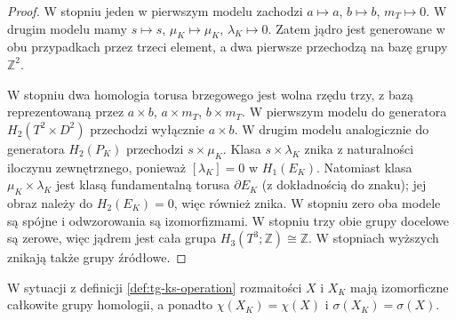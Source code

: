 \begin{proof}
W stopniu jeden w pierwszym modelu zachodzi
$a\mapsto a$, $b\mapsto b$, $m_T\mapsto0$.
W drugim modelu mamy $s\mapsto s$,
$\mu_K\mapsto\mu_K$, $\lambda_K\mapsto0$.
Zatem jądro jest generowane w obu przypadkach
przez trzeci element, a dwa pierwsze przechodzą
na bazę grupy $\mathbb Z^2$.

W stopniu dwa homologia torusa brzegowego jest
wolna rzędu trzy, z bazą reprezentowaną przez
$a\times b$, $a\times m_T$, $b\times m_T$.
W pierwszym modelu do generatora $H_2(T^2\times D^2)$
przechodzi wyłącznie $a\times b$.
W drugim modelu analogicznie do generatora $H_2(P_K)$
przechodzi $s\times\mu_K$. Klasa $s\times\lambda_K$
znika z naturalności iloczynu zewnętrznego, ponieważ
$[\lambda_K]=0$ w $H_1(E_K)$. Natomiast klasa
$\mu_K\times\lambda_K$ jest klasą fundamentalną
torusa $\partial E_K$ (z dokładnością do znaku);
jej obraz należy do $H_2(E_K)=0$, więc również znika.
W stopniu zero oba modele są spójne i odwzorowania
są izomorfizmami. W stopniu trzy obie grupy docelowe
są zerowe, więc jądrem jest cała grupa
$H_3(T^3;\mathbb Z)\cong\mathbb Z$.
W stopniach wyższych znikają także grupy źródłowe.
\end{proof}

\begin{wniosek}
\label{cor:tg-ks-invariants}
W sytuacji z definicji \ref{def:tg-ks-operation}
rozmaitości $X$ i $X_K$ mają izomorficzne
całkowite grupy homologii, a ponadto
$\chi(X_K)=\chi(X)$ i $\sigma(X_K)=\sigma(X)$.
\end{wniosek}

